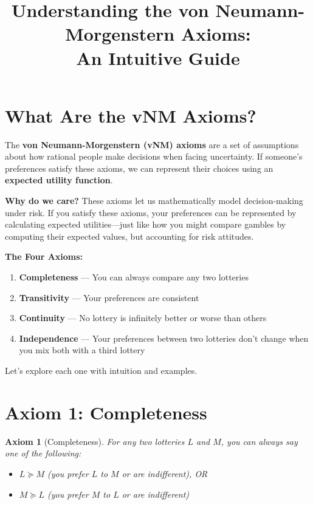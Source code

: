 \documentclass[12pt]{article}
\title{Understanding the von Neumann-Morgenstern Axioms: \\ An Intuitive Guide}
\author{}
\date{}
\newtheorem{axiom}{Axiom}
\begin{document}
\maketitle

\section{What Are the vNM Axioms?}

The \textbf{von Neumann-Morgenstern (vNM) axioms} are a set of assumptions about how rational people make decisions when facing uncertainty. If someone's preferences satisfy these axioms, we can represent their choices using an \textbf{expected utility function}.

\textbf{Why do we care?} These axioms let us mathematically model decision-making under risk. If you satisfy these axioms, your preferences can be represented by calculating expected utilities—just like how you might compare gambles by computing their expected values, but accounting for risk attitudes.

\vspace{0.3cm}

\noindent\textbf{The Four Axioms:}
\begin{enumerate}
\item \textbf{Completeness} — You can always compare any two lotteries
\item \textbf{Transitivity} — Your preferences are consistent
\item \textbf{Continuity} — No lottery is infinitely better or worse than others
\item \textbf{Independence} — Your preferences between two lotteries don't change when you mix both with a third lottery
\end{enumerate}

Let's explore each one with intuition and examples.

\newpage

\section{Axiom 1: Completeness}

\begin{axiom}[Completeness]
For any two lotteries $L$ and $M$, you can always say one of the following:
\begin{itemize}
\item $L \succeq M$ (you prefer $L$ to $M$ or are indifferent), OR
\item $M \succeq L$ (you prefer $M$ to $L$ or are indifferent)
\end{itemize}
\end{axiom}
\end{document}
